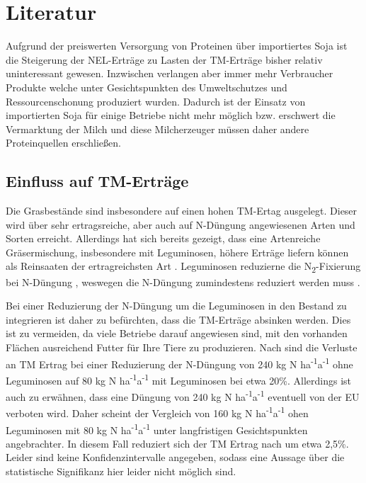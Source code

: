 
\section{Literatur}
\label{sec:Literatur}

Aufgrund der preiswerten Versorgung von Proteinen über importiertes Soja ist die Steigerung der \ac{NEL}-Erträge zu Lasten der \ac{TM}-Erträge bisher relativ uninteressant gewesen.
Inzwischen verlangen aber immer mehr Verbraucher Produkte welche unter Gesichtspunkten des Umweltschutzes und Ressourcenschonung produziert wurden.
Dadurch ist der Einsatz von importierten Soja für einige Betriebe nicht mehr möglich bzw. erschwert die Vermarktung der Milch und diese Milcherzeuger müssen daher andere Proteinquellen erschließen.

\subsection{Einfluss auf TM-Erträge}
\label{subsec:TM}

Die Grasbestände sind insbesondere auf einen hohen \ac{TM}-Ertag ausgelegt.
Dieser wird über sehr ertragsreiche, aber auch auf N-Düngung angewiesenen Arten und Sorten erreicht.
Allerdings hat sich bereits gezeigt, dass eine Artenreiche Gräsermischung, insbesondere mit Leguminosen, höhere Erträge liefern können als Reinsaaten der ertragreichsten Art \parencite{nyfeler2009strong}. %
Leguminosen reduzierne die N\textsubscript{2}-Fixierung bei N-Düngung \parencite{ledgard2001nitrogen}, weswegen die N-Düngung zumindestens reduziert werden muss \parencite[34]{weggler2050leguminosen}.

Bei einer Reduzierung der N-Düngung um die Leguminosen in den Bestand zu integrieren ist daher zu befürchten, dass die \ac{TM}-Erträge absinken werden.
Dies ist zu vermeiden, da viele Betriebe darauf angewiesen sind, mit den vorhanden Flächen ausreichend Futter für Ihre Tiere zu produzieren.
Nach \textcite[11]{engel2013protein} sind die Verluste an \ac{TM} Ertrag bei einer Reduzierung der N-Düngung von 240 kg N ha\textsuperscript{-1}a\textsuperscript{-1} ohne Leguminosen auf 80 kg N ha\textsuperscript{-1}a\textsuperscript{-1} mit Leguminosen bei etwa 20\%.
Allerdings ist auch zu erwähnen, dass eine Düngung von 240 kg N ha\textsuperscript{-1}a\textsuperscript{-1} eventuell von der \ac{EU} verboten wird.
Daher scheint der Vergleich von 160 kg N ha\textsuperscript{-1}a\textsuperscript{-1} ohen Leguminosen mit 80 kg N ha\textsuperscript{-1}a\textsuperscript{-1} unter langfristigen Gesichtspunkten angebrachter.
In diesem Fall reduziert sich der \ac{TM} Ertrag nach \textcite[11]{engel2013protein} um etwa 2,5\%.
Leider sind keine Konfidenzintervalle angegeben, sodass eine Aussage über die statistische Signifikanz hier leider nicht möglich sind.

